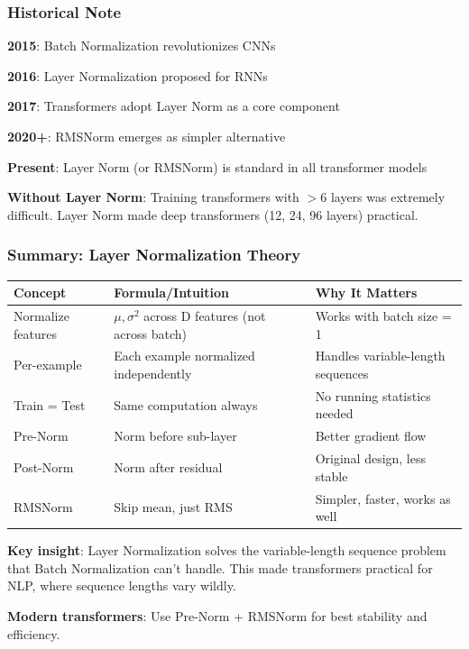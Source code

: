 \subsubsection{Historical Note}

\textbf{2015}: Batch Normalization revolutionizes CNNs

\textbf{2016}: Layer Normalization proposed for RNNs

\textbf{2017}: Transformers adopt Layer Norm as a core component

\textbf{2020+}: RMSNorm emerges as simpler alternative

\textbf{Present}: Layer Norm (or RMSNorm) is standard in all transformer models

\textbf{Without Layer Norm}: Training transformers with $>6$ layers was extremely difficult. Layer Norm made deep transformers (12, 24, 96 layers) practical.

\subsubsection{Summary: Layer Normalization Theory}

\begin{center}
\begin{tabular}{lll}
\hline
\textbf{Concept} & \textbf{Formula/Intuition} & \textbf{Why It Matters} \\
\hline
Normalize features & $\mu, \sigma^2$ across D features (not across batch) & Works with batch size = 1 \\
Per-example & Each example normalized independently & Handles variable-length sequences \\
Train = Test & Same computation always & No running statistics needed \\
Pre-Norm & Norm before sub-layer & Better gradient flow \\
Post-Norm & Norm after residual & Original design, less stable \\
RMSNorm & Skip mean, just RMS & Simpler, faster, works as well \\
\hline
\end{tabular}
\end{center}

\textbf{Key insight}: Layer Normalization solves the variable-length sequence problem that Batch Normalization can't handle. This made transformers practical for NLP, where sequence lengths vary wildly.

\textbf{Modern transformers}: Use Pre-Norm + RMSNorm for best stability and efficiency.

